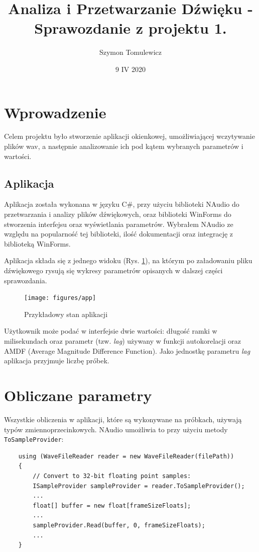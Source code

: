 \documentclass[12pt,a4paper]{article}
\begin{document}
\title{Analiza i Przetwarzanie Dźwięku - Sprawozdanie z projektu 1.}
\author{Szymon Tomulewicz}
\date{9 IV 2020}
\maketitle
\tableofcontents
\newpage

\section{Wprowadzenie\label{sec:wprowadzenie}}
Celem projektu było stworzenie aplikacji okienkowej, umożliwiającej wczytywanie plików wav,
a następnie analizowanie ich pod kątem wybranych parametrów i wartości.

\subsection{Aplikacja\label{sec:aplikacja}}
Aplikacja została wykonana w języku C\#, przy użyciu biblioteki NAudio do przetwarzania i analizy
plików dźwiękowych, oraz biblioteki WinForms do stworzenia interfejsu oraz wyświetlania parametrów.
Wybrałem NAudio ze względu na popularność tej biblioteki, ilość dokumentacji oraz integrację z
biblioteką WinForms.

Aplikacja składa się z jednego widoku (Rys. \ref{fig:app}), na którym po załadowaniu pliku
dźwiękowego rysują się wykresy parametrów opisanych w dalszej części sprawozdania.

\begin{figure}[h!]
\centering
\texttt{[image: figures/app]}
\caption{Przykładowy stan aplikacji}
\label{fig:app}
\end{figure}

Użytkownik może podać w interfejsie dwie wartości: długość ramki w milisekundach oraz parametr (tzw.
\emph{lag}) używany w funkcji autokorelacji oraz AMDF (Average Magnitude Difference Function). Jako
jednostkę parametru \emph{lag} aplikacja przyjmuje liczbę próbek.

\section{Obliczane parametry\label{sec:parametry}}
Wszystkie obliczenia w aplikacji, które są wykonywane na próbkach, używają typów
zmiennoprzecinkowych. NAudio umożliwia to przy użyciu metody \verb|ToSampleProvider|:

\begin{verbatim}
    using (WaveFileReader reader = new WaveFileReader(filePath))
    {
        // Convert to 32-bit floating point samples:
        ISampleProvider sampleProvider = reader.ToSampleProvider();
        ...
        float[] buffer = new float[frameSizeFloats];
        ...
        sampleProvider.Read(buffer, 0, frameSizeFloats);
        ...
    }
\end{verbatim}
\end{document}
